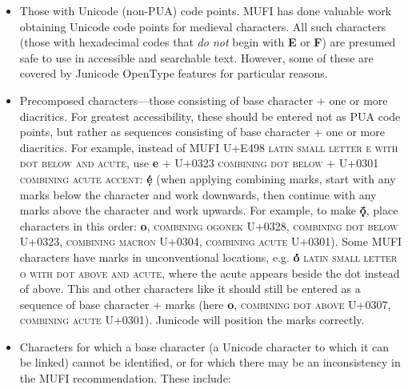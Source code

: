 \documentclass[12pt,letterpaper,openany]{book}
\newcommand\textLetterExample[1]{\textrm{\textbf{\color{BrickRed}#1}}}
\newcommand\textUName[1]{\textsc{#1}}
\newcommand\textstyleEmphasis[1]{\textit{#1}}
\newcommand\liststyleLi{%
\renewcommand\labelitemi{{\textbullet}}
\renewcommand\labelitemii{{\textbullet}}
\renewcommand\labelitemiii{{\textbullet}}
\renewcommand\labelitemiv{{\textbullet}}
}
\begin{document}
\liststyleLi
\begin{itemize}
\item Those with Unicode (non-PUA) code points. MUFI has done valuable work obtaining Unicode code points for medieval characters.
All such characters (those with hexadecimal codes that \textstyleEmphasis{do not} begin with \textLetterExample{E}
or \textLetterExample{F}) are presumed safe to use in accessible and searchable text. However, some of these are
covered by Junicode OpenType features for particular reasons.
\item Precomposed characters---those consisting of base character + one or more diacritics. For greatest accessibility,
these should be entered not as PUA code points, but rather as sequences consisting of base character + one or more
diacritics. For example, instead of MUFI U+E498 \textUName{latin small letter e with dot below and acute}, use
\textLetterExample{e} + U+0323 \textUName{combining dot below} + U+0301 \textUName{combining acute accent}:
\textLetterExample{ẹ́} (when applying combining marks, start with any marks below the character and work
downwards, then continue with any marks above the character and work upwards. For example, to make
\textLetterExample{ǭ̣́}, place characters in this order: \textLetterExample{o},
\textUName{combining ogonek} U+0328, \textUName{combining dot below} U+0323, \textUName{combining
macron} U+0304, \textUName{combining acute} U+0301). Some MUFI characters have marks in unconventional locations,
e.g. \textLetterExample{ȯ́} \textUName{latin small letter o with dot above and acute}, where the
acute appears beside the dot instead of above. This and other characters like it should still be entered as a sequence
of base character + marks (here \textLetterExample{o}, \textUName{combining dot above} U+0307,
\textUName{combining acute} U+0301). Junicode will position the marks correctly.
\item Characters for which a base character (a Unicode character to which it can be linked) cannot be identified, or for
which there may be an inconsistency in the MUFI recommendation. These include:


\end{itemize}
\end{document}
